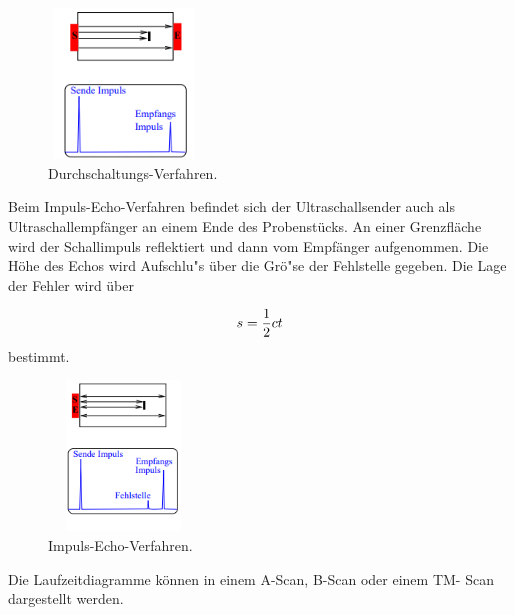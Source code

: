 \begin{figure}[H]
    \begin{center}
    \includegraphics[width = 4cm, height= 4cm]{Durchschaltungsverfahren.png}
    \caption{Durchschaltungs-Verfahren.\protect\cite{AL}}
    \end{center}
    \label{fig:Durchschaltungsverfahren}
    \end{figure}
    \noindent
Beim Impuls-Echo-Verfahren befindet sich der Ultraschallsender auch als Ultraschallempfänger an einem Ende des Probenstücks. An einer Grenzfläche wird der Schallimpuls reflektiert und dann vom Empfänger
aufgenommen.  Die Höhe des Echos wird Aufschlu"s  über die Grö"se der Fehlstelle gegeben. Die Lage der Fehler wird über
 
\begin{equation}
    s= \frac{1}{2} ct\\
\end{equation}
\noindent bestimmt.
\begin{figure}[H]
    \begin{center}
    \includegraphics[width = 4cm, height= 4cm]{Impulsecho.png}
    \caption{Impuls-Echo-Verfahren.\protect\cite{AL}}
    \end{center}
    \label{fig:Impulsecho}
    \end{figure}
    \noindent
Die Laufzeitdiagramme können in einem A-Scan, B-Scan oder einem  TM- Scan dargestellt werden.





